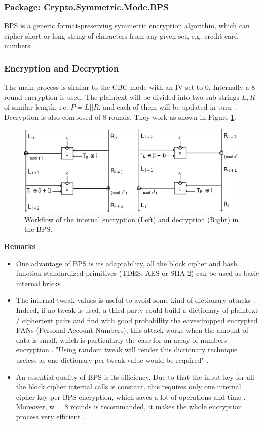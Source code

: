 \subsubsection*{Package: Crypto.Symmetric.Mode.BPS}
BPS is a generic format-preserving symmetric encryption algorithm,
which can cipher short or long string of characters from any given
set, e.g. credit card numbers.

\subsubsection*{Encryption and Decryption}
The main process is similar to the CBC mode with an IV set to 0.
Internally a 8-round encryption is used. The plaintext will be divided
into two sub-strings $L,R$ of similar length, i.e. $P=L||R$, and each
of them will be updated in turn \cite{BPS}. Decryption is also
composed of 8 rounds. They work as shown in Figure \ref{BPSED}.
\begin{figure}[htp]
\center
\includegraphics[scale=0.8]{./images/BPS_En_De}
\caption{Workflow of the internal encryption (Left) and decryption
  (Right) in the BPS. \cite{BPS}}\label{BPSED} \center
\end{figure}


\noindent\textbf{Remarks}
\begin{itemize}
\item One advantage of BPS is its adaptability, all the block cipher
  and hash function standardized primitives (TDES, AES or SHA-2) can
  be used as basic internal bricks \cite{BPS}.
\item The internal tweak values is useful to avoid some kind of
  dictionary attacks \cite{BPS}. Indeed, if no tweak is used, a third
  party could build a dictionary of plaintext / ciphertext pairs and
  find with good probability the eavesdropped encrypted PANs (Personal
  Account Numbers), this attack works when the amount of data is
  small, which is particularly the case for an array of numbers
  encryption \cite{BPS}. "Using random tweak will render this
  dictionary technique useless as one dictionary per tweak value would
  be required" \cite{BPS}.
\item An essential quality of BPS is its efficiency. Due to that the
  input key for all the block cipher internal calls is constant, this
  requires only one internal cipher key per BPS encryption, which
  saves a lot of operations and time \cite{BPS}. Moreover, w = 8
  rounds is recommanded, it makes the whole encryption process very
  efficient \cite{BPS}.
\end{itemize}
